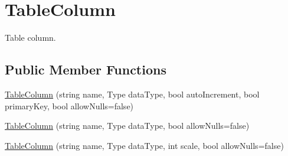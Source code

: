 \hypertarget{structOTA_1_1Data_1_1TableColumn}{}\section{Table\+Column}
\label{structOTA_1_1Data_1_1TableColumn}


Table column.  


\subsection*{Public Member Functions}
\begin{DoxyCompactItemize}
\item 
\hyperlink{structOTA_1_1Data_1_1TableColumn_addc926f8204ea0984eee566293e37cad}{Table\+Column} (string name, Type data\+Type, bool auto\+Increment, bool primary\+Key, bool allow\+Nulls=false)
\item 
\hyperlink{structOTA_1_1Data_1_1TableColumn_a4fc2d162b930ee2abeffc2331335fee0}{Table\+Column} (string name, Type data\+Type, bool allow\+Nulls=false)
\item 
\hyperlink{structOTA_1_1Data_1_1TableColumn_a4fad5cf65cfb83755b69b87bddaa7fa5}{Table\+Column} (string name, Type data\+Type, int scale, bool allow\+Nulls=false)
\end{DoxyCompactItemize}
